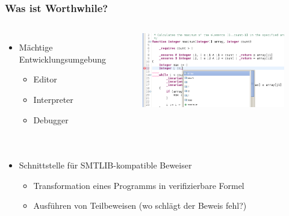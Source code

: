 \documentclass[t,svgnames]{beamer}
\begin{document}
\begin{frame}
	\frametitle{Was ist Worthwhile?}
	
	\begin{columns}[c]
			\begin{itemize}
			\item Mächtige Entwicklungsumgebung
			\begin{itemize}
				\item Editor
				\item Interpreter
				\item Debugger
			\end{itemize}
		\end{itemize}	
		
		
			\begin{figure}
				\includegraphics[width=\textwidth]{screenshot1.png}			
			\end{figure}
			
	\end{columns}	

	\pause
	
		\begin{columns}[c]
			\begin{itemize}
			\item Schnittstelle für SMTLIB-kompatible Beweiser
			\begin{itemize}
				\item Transformation eines Programms in verifizierbare Formel
				\item Ausführen von Teilbeweisen (wo schlägt der Beweis fehl?)
			\end{itemize}
		\end{itemize}	
		


\end{columns}
\end{frame}
\end{document}
